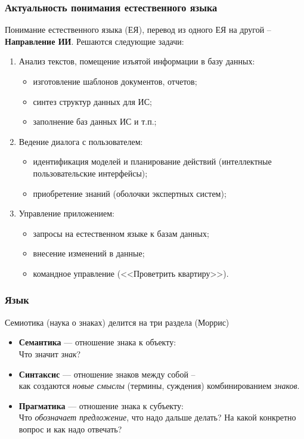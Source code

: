 \documentclass[10pt]{beamer}
\begin{document}
\begin{frame}
  \frametitle{Актуальность понимания естественного языка}
  \footnotesize
  Понимание естественного языка (ЕЯ), перевод из одного ЕЯ на другой -- \textbf{Направление ИИ}. Решаются следующие задачи:
  \begin{enumerate}
  \item Анализ текстов, помещение изъятой информации в базу данных:
    \begin{itemize}
    \item изготовление шаблонов документов, отчетов;
    \item синтез структур данных для ИС;
    \item заполнение баз данных ИС и т.п.;
    \end{itemize}
  \item Ведение диалога с пользователем:
    \begin{itemize}
    \item идентификация моделей и планирование действий (интеллектные пользовательские интерфейсы);
    \item приобретение знаний (оболочки экспертных систем);
    \end{itemize}
  \item Управление приложением:
    \begin{itemize}
    \item запросы на естественном языке к базам данных;
    \item внесение изменений в данные;
    \item командное управление (<<Проветрить квартиру>>).
    \end{itemize}
  \end{enumerate}
\end{frame}
\begin{frame}
  \frametitle{Язык}
  \begin{block}{Семиотика (наука о знаках) делится на три раздела (Моррис)}
  \begin{itemize}
  \item \textbf{Семантика} — отношение знака к объекту: \\ Что значит \emph{знак}?
  \item \textbf{Синтаксис} — отношение знаков между собой --\\ как создаются \emph{новые смыслы} (термины, суждения) комбинированием \emph{знаков}.
  \item \textbf{Прагматика} — отношение знака к субъекту:\\ Что \emph{обозначает предложение}, что надо дальше делать? На какой конкретно вопрос и как надо отвечать?
  \end{itemize}
\end{block}
\end{frame}
\end{document}
